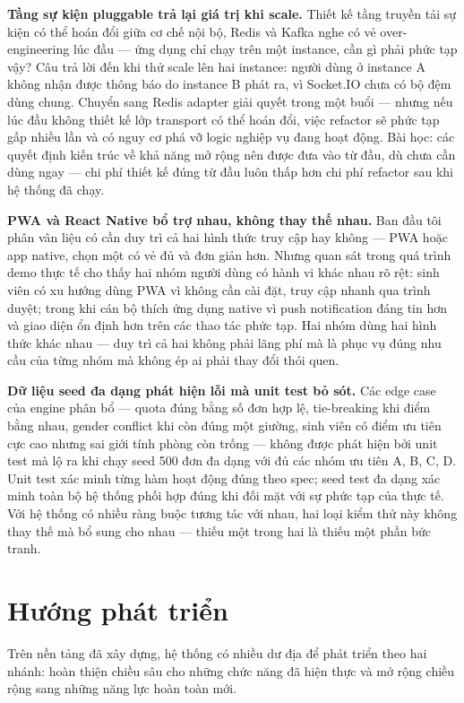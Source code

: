 \documentclass[../DoAn.tex]{subfiles}
\begin{document}
\textbf{Tầng sự kiện pluggable trả lại giá trị khi scale.} Thiết kế tầng truyền
tải sự kiện có thể hoán đổi giữa cơ chế nội bộ, Redis và Kafka nghe có vẻ over-
engineering lúc đầu --- ứng dụng chỉ chạy trên một instance, cần gì phải phức
tạp vậy? Câu trả lời đến khi thử scale lên hai instance: người dùng ở instance
A không nhận được thông báo do instance B phát ra, vì Socket.IO chưa có bộ đệm
dùng chung. Chuyển sang Redis adapter giải quyết trong một buổi --- nhưng nếu
lúc đầu không thiết kế lớp transport có thể hoán đổi, việc refactor sẽ phức
tạp gấp nhiều lần và có nguy cơ phá vỡ logic nghiệp vụ đang hoạt động. Bài học:
các quyết định kiến trúc về khả năng mở rộng nên được đưa vào từ đầu, dù chưa
cần dùng ngay --- chi phí thiết kế đúng từ đầu luôn thấp hơn chi phí refactor
sau khi hệ thống đã chạy.

\textbf{PWA và React Native bổ trợ nhau, không thay thế nhau.} Ban đầu tôi phân
vân liệu có cần duy trì cả hai hình thức truy cập hay không --- PWA hoặc app
native, chọn một có vẻ đủ và đơn giản hơn. Nhưng quan sát trong quá trình demo
thực tế cho thấy hai nhóm người dùng có hành vi khác nhau rõ rệt: sinh viên có
xu hướng dùng PWA vì không cần cài đặt, truy cập nhanh qua trình duyệt; trong
khi cán bộ thích ứng dụng native vì push notification đáng tin hơn và giao diện
ổn định hơn trên các thao tác phức tạp. Hai nhóm dùng hai hình thức khác nhau
--- duy trì cả hai không phải lãng phí mà là phục vụ đúng nhu cầu của từng nhóm
mà không ép ai phải thay đổi thói quen.

\textbf{Dữ liệu seed đa dạng phát hiện lỗi mà unit test bỏ sót.} Các edge case
của engine phân bổ --- quota đúng bằng số đơn hợp lệ, tie-breaking khi điểm
bằng nhau, gender conflict khi còn đúng một giường, sinh viên có điểm ưu tiên
cực cao nhưng sai giới tính phòng còn trống --- không được phát hiện bởi unit
test mà lộ ra khi chạy seed 500 đơn đa dạng với đủ các nhóm ưu tiên A, B, C,
D. Unit test xác minh từng hàm hoạt động đúng theo spec; seed test đa dạng xác
minh toàn bộ hệ thống phối hợp đúng khi đối mặt với sự phức tạp của thực tế.
Với hệ thống có nhiều ràng buộc tương tác với nhau, hai loại kiểm thử này không
thay thế mà bổ sung cho nhau --- thiếu một trong hai là thiếu một phần bức tranh.

\section{Hướng phát triển}
\label{section:6.2}

Trên nền tảng đã xây dựng, hệ thống có nhiều dư địa để phát triển theo hai
nhánh: hoàn thiện chiều sâu cho những chức năng đã hiện thực và mở rộng chiều
rộng sang những năng lực hoàn toàn mới.
\end{document}
